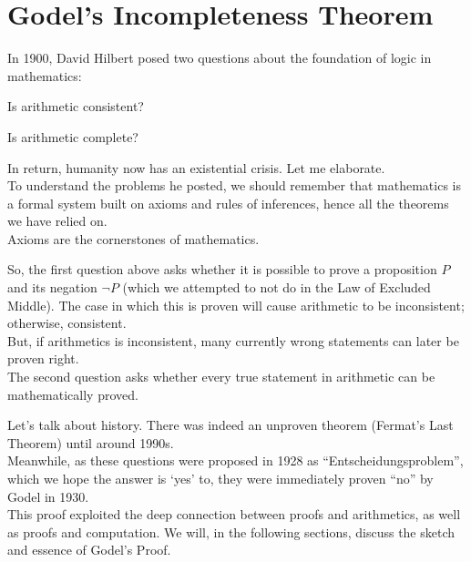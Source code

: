 \section{Godel's Incompleteness Theorem}
In 1900, David Hilbert posed two questions about the foundation of logic in mathematics:
\begin{bindenum}
    \item Is arithmetic consistent?
    \item Is arithmetic complete?
\end{bindenum}
In return, humanity now has an existential crisis. Let me elaborate. \\
To understand the problems he posted, we should remember that mathematics is a formal system built on axioms and rules of inferences, hence all the theorems we have relied on. \\
Axioms are the cornerstones of mathematics.

So, the first question above asks whether it is possible to prove a proposition $P$ and its negation $\neg P$ (which we attempted to not do in the Law of Excluded Middle). The case in which this is proven will cause arithmetic to be inconsistent; otherwise, consistent. \\
But, if arithmetics is inconsistent, many currently wrong statements can later be proven right. \\
The second question asks whether every true statement in arithmetic can be mathematically proved.

Let's talk about history. There was indeed an unproven theorem (Fermat's Last Theorem) until around 1990s. \\
Meanwhile, as these questions were proposed in 1928 as ``Entscheidungsproblem'', which we hope the answer is `yes' to, they were immediately proven ``no'' by Godel in 1930. \\
This proof exploited the deep connection between proofs and arithmetics, as well as proofs and computation. We will, in the following sections, discuss the sketch and essence of Godel's Proof.

